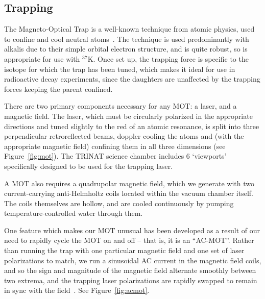 \subsection{Trapping}
\label{trap}
The Magneto-Optical Trap is a well-known technique from atomic physics, used to confine and cool neutral atoms~\cite{raabprentiss}.  The technique is used predominantly with alkalis due to their simple orbital electron structure, and is quite robust, so is appropriate for use with $^{37}\textrm{K}$.  Once set up, the trapping force is specific to the isotope for which the trap has been tuned, which makes it ideal for use in radioactive decay experiments, since the daughters are unaffected by the trapping forces keeping the parent confined.

There are two primary components necessary for any MOT:  a laser, and a magnetic field.  The laser, which must be circularly polarized in the appropriate directions and tuned slightly to the red of an atomic resonance, is split into three perpendicular retroreflected beams, doppler cooling the atoms and (with the appropriate magnetic field) confining them in all three dimensions (see Figure~\ref{fig:mot}).  The TRINAT science chamber includes 6 `viewports' specifically designed to be used for the trapping laser.

A MOT also requires a quadrupolar magnetic field, which we generate with two current-carrying anti-Helmholtz coils located within the vacuum chamber itself.  The coils themselves are hollow, and are cooled continuously by pumping temperature-controlled water through them.   

One feature which makes our MOT unusual has been developed as a result of our need to rapidly cycle the MOT on and off -- that is, it is an ``AC-MOT''.  Rather than running the trap with one particular magnetic field and one set of laser polarizations to match, we run a sinusoidal AC current in the magnetic field coils, and so the sign and magnitude of the magnetic field alternate smoothly between two extrema, and the trapping laser polarizations are rapidly swapped to remain in sync with the field~\cite{harveymurray}\cite{thesis}.  See Figure~\ref{fig:acmot}.  

